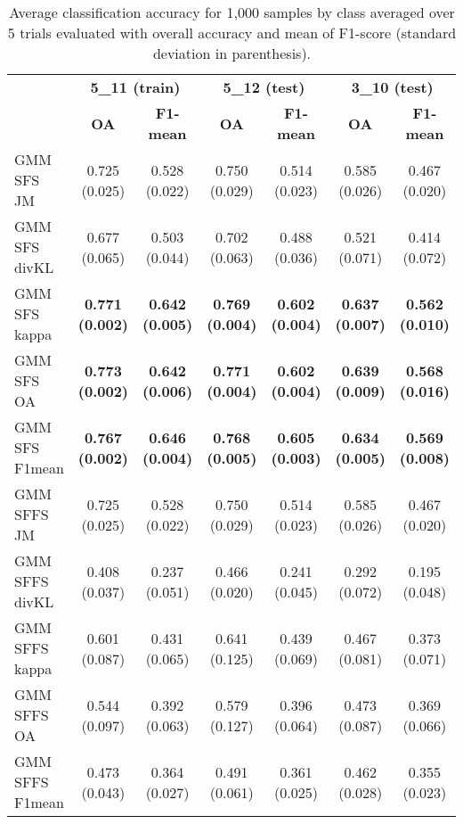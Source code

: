 \documentclass[a4paper,10pt,DIV=16]{scrartcl}
\begin{document}
    \begin{table}[!t]
        \centering
        \caption{Average classification accuracy for 1,000 samples by class averaged over 5 trials  evaluated with overall accuracy and mean of F1-score (standard deviation in parenthesis).\label{tab:potsdam-otbsimu-othereval}}
        \begin{tabular}{lcccccc}\toprule
             & \multicolumn{2}{c}{\bfseries 5\_11 (train)} & \multicolumn{2}{c}{\bfseries 5\_12 (test)} & \multicolumn{2}{c}{\bfseries 3\_10 (test)} \\ \cmidrule{2-7}
             & {\bfseries OA} & {\bfseries F1-mean} & {\bfseries OA} & {\bfseries F1-mean} & {\bfseries OA} & {\bfseries F1-mean} \\ \cmidrule{2-7}

            GMM SFS JM &      0.725 (0.025) & 0.528 (0.022) & 0.750 (0.029) & 0.514 (0.023) & 0.585 (0.026) & 0.467 (0.020) \\
            GMM SFS divKL &   0.677 (0.065) & 0.503 (0.044) & 0.702 (0.063) & 0.488 (0.036) & 0.521 (0.071) & 0.414 (0.072) \\
            GMM SFS kappa &   {\bfseries 0.771 (0.002)} & {\bfseries 0.642 (0.005)} & {\bfseries 0.769 (0.004)} & {\bfseries 0.602 (0.004)} & {\bfseries 0.637 (0.007)} & {\bfseries 0.562 (0.010)} \\
            GMM SFS OA &      {\bfseries 0.773 (0.002)} & {\bfseries 0.642 (0.006)} & {\bfseries 0.771 (0.004)} & {\bfseries 0.602 (0.004)} & {\bfseries 0.639 (0.009)} & {\bfseries 0.568 (0.016)} \\
            GMM SFS F1mean &  {\bfseries 0.767 (0.002)} & {\bfseries 0.646 (0.004)} & {\bfseries 0.768 (0.005)} & {\bfseries 0.605 (0.003)} & {\bfseries 0.634 (0.005)} & {\bfseries 0.569 (0.008)} \\
            GMM SFFS JM &     0.725 (0.025) & 0.528 (0.022) & 0.750 (0.029) & 0.514 (0.023) & 0.585 (0.026) & 0.467 (0.020) \\
            GMM SFFS divKL &  0.408 (0.037) & 0.237 (0.051) & 0.466 (0.020) & 0.241 (0.045) & 0.292 (0.072) & 0.195 (0.048) \\
            GMM SFFS kappa &  0.601 (0.087) & 0.431 (0.065) & 0.641 (0.125) & 0.439 (0.069) & 0.467 (0.081) & 0.373 (0.071) \\
            GMM SFFS OA &     0.544 (0.097) & 0.392 (0.063) & 0.579 (0.127) & 0.396 (0.064) & 0.473 (0.087) & 0.369 (0.066) \\
            GMM SFFS F1mean & 0.473 (0.043) & 0.364 (0.027) & 0.491 (0.061) & 0.361 (0.025) & 0.462 (0.028) & 0.355 (0.023) \\
            \bottomrule
        \end{tabular}
    \end{table}
\end{document}
